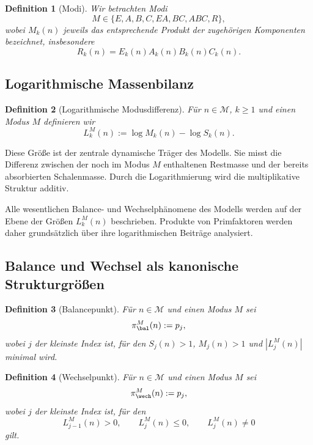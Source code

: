 \documentclass[11pt,a4paper]{article}
\newtheorem{definition}{Definition}[section]
\begin{document}
	\begin{definition}[Modi]
		\label{def:modell_modi}
		Wir betrachten Modi
		\[
		M\in\{E,A,B,C,EA,BC,ABC,R\},
		\]
		wobei \(M_k(n)\) jeweils das entsprechende Produkt der zugehörigen Komponenten bezeichnet, insbesondere
		\[
		R_k(n)=E_k(n)A_k(n)B_k(n)C_k(n).
		\]
	\end{definition}
	
	\subsection{Logarithmische Massenbilanz}
	
	\begin{definition}[Logarithmische Modusdifferenz]
		\label{def:modell_lmk}
		Für \(n\in\mathcal M\), \(k\ge 1\) und einen Modus \(M\) definieren wir
		\[
		L_k^M(n):=\log M_k(n)-\log S_k(n).
		\]
	\end{definition}
	
	\begin{bemerkung}
		Diese Größe ist der zentrale dynamische Träger des Modells. Sie misst die Differenz zwischen der noch im Modus \(M\) enthaltenen Restmasse und der bereits absorbierten Schalenmasse. Durch die Logarithmierung wird die multiplikative Struktur additiv.
	\end{bemerkung}
	
	\begin{axiom}
		\label{ax:additivitaet}
		Alle wesentlichen Balance- und Wechselphänomene des Modells werden auf der Ebene der Größen \(L_k^M(n)\) beschrieben. Produkte von Primfaktoren werden daher grundsätzlich über ihre logarithmischen Beiträge analysiert.
	\end{axiom}
	
	\subsection{Balance und Wechsel als kanonische Strukturgrößen}
	
	\begin{definition}[Balancepunkt]
		\label{def:modell_bal}
		Für \(n\in\mathcal M\) und einen Modus \(M\) sei
		\[
		\pi_{\bal}^M(n):=p_j,
		\]
		wobei \(j\) der kleinste Index ist, für den \(S_j(n)>1\), \(M_j(n)>1\) und \(|L_j^M(n)|\) minimal wird.
	\end{definition}
	
	\begin{definition}[Wechselpunkt]
		\label{def:modell_wech}
		Für \(n\in\mathcal M\) und einen Modus \(M\) sei
		\[
		\pi_{\wech}^M(n):=p_j,
		\]
		wobei \(j\) der kleinste Index ist, für den
		\[
		L_{j-1}^M(n)>0,\qquad L_j^M(n)\le 0,\qquad L_j^M(n)\neq 0
		\]
		gilt.
	\end{definition}
	
\end{document}
